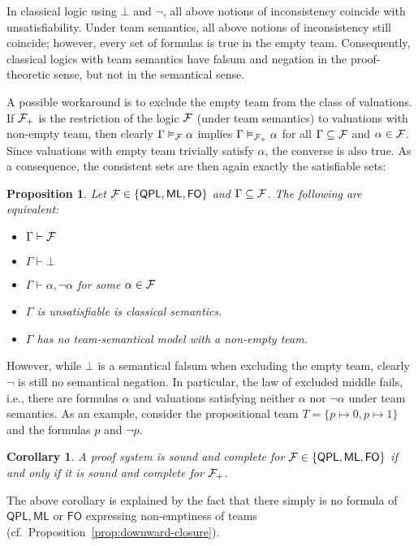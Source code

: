 \documentclass[a4paper,english,fleqn,11pt,final]{scrartcl}
\makeatletter
\newcommand{\ie}{i.e.\@\xspace}
\newcommand{\logic}[1]{\ensuremath{\mathsf{#1}}\xspace}
\newcommand{\QPL}{\logic{QPL}}
\newcommand{\ML}{\logic{ML}}
\newcommand{\FO}{\logic{FO}}
\newcommand{\calF}{\protect\ensuremath{\mathcal{F}}}
\theoremstyle{plain}
\newtheorem{proposition}[theorem]{Proposition}
\newtheorem{corollary}[theorem]{Corollary}
\theoremstyle{definition}
\makeatother
\begin{document}
\smallskip

In classical logic using $\bot$ and $\neg$, all above notions of inconsistency coincide with unsatisfiability.
Under team semantics, all above notions of inconsistency still coincide; however, every set of formulas is true in the empty team.
Consequently, classical logics with team semantics have falsum and negation in the proof-theoretic sense, but not in the semantical sense.

A possible workaround is to exclude the empty team from the class of valuations.
If $\calF_+$ is the restriction of the logic $\calF$ (under team semantics) to valuations with non-empty team, then clearly $\Gamma \vDash_\calF \alpha$ implies $\Gamma \vDash_{\calF_+} \alpha$ for all $\Gamma \subseteq \calF$ and $\alpha \in \calF$.
Since valuations with empty team trivially satisfy $\alpha$, the converse is also true.
As a consequence, the consistent sets are then again exactly the satisfiable sets:

\begin{proposition}
Let $\calF \in \{\QPL,\ML,\FO\}$ and $\Gamma \subseteq \calF$.
The following are equivalent:
\begin{itemize}
\item $\Gamma \vdash \calF$
\item $\Gamma \vdash \bot$
\item $\Gamma \vdash \alpha,\neg\alpha$ for some $\alpha \in \calF$
\item $\Gamma$ is unsatisfiable is classical semantics.
\item $\Gamma$ has no team-semantical model with a non-empty team.
\end{itemize}
\end{proposition}

However, while $\bot$ is a semantical falsum when excluding the empty team, clearly $\neg$ is still no semantical negation.
In particular, the law of excluded middle fails, \ie, there are formulas $\alpha$ and valuations satisfying neither $\alpha$ nor $\neg \alpha$ under team semantics.
As an example, consider the propositional team $T = \{ p \mapsto 0, p \mapsto 1 \}$ and the formulas $p$ and $\neg p$.

\begin{corollary}
A proof system is sound and complete for $\calF  \in \{\QPL,\ML,\FO\}$ if and only if it is sound and complete for $\calF_+$.
\end{corollary}

The above corollary is explained by the fact that there simply is no formula of $\QPL, \ML$ or $\FO$ expressing non-emptiness of teams (cf.\ Proposition~\ref{prop:downward-closure}).
\end{document}
